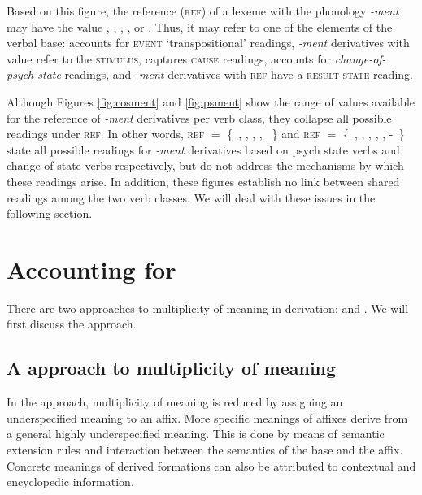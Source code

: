 \documentclass[output=paper]{langsci/langscibook}
\begin{document}
Based on this figure, the reference (\textsc{ref}) of a lexeme with the phonology \textit{-ment} may have the value , , , , or . Thus, it may refer to one of the elements of the verbal base:  accounts for \textsc{event} `transpositional' readings, \textit{\mbox{-ment}} derivatives with value  refer to the \textsc{stimulus},  captures \textsc{cause} readings,  accounts for \textit{change-of-psych-state} readings, and \textit{-ment} derivatives with \textsc{ref}  have a \textsc{result state} reading.

Although Figures \ref{fig:cosment} and \ref{fig:psment}  show the range of values available for the reference of \textit{-ment} derivatives per verb class, they collapse all possible readings under \textsc{ref}. In other words, \textsc{ref} $=$ \{~, , , , ~\}  and 	\textsc{ref} $=$ \{~, , , , , -~\} state all possible readings for \textit{-ment} derivatives based on psych state verbs and change-of-state verbs respectively, but do not address the mechanisms by which these readings arise. In addition, these figures establish no link between shared readings among the two verb classes. We will deal with these issues in the following section.


\section{Accounting for }

There are two approaches to multiplicity of meaning in derivation:  and . We will first discuss the  approach.

\subsection{A  approach to multiplicity of meaning}

 In the  approach, multiplicity of meaning is reduced by assigning an underspecified meaning to an affix. More specific meanings of affixes derive from a general highly underspecified meaning. This is done by means of semantic extension rules and interaction between the semantics of the base and the affix. Concrete meanings of derived formations can also be attributed to contextual and encyclopedic information.
\end{document}
